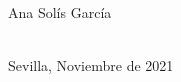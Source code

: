 \begin{titlepage}
\begin{minipage}{14cm}
\HRule \\[3.5cm]


{\Large

Ana Solís García} \\[0.5cm]

{\large
Sevilla, Noviembre de 2021
}

\end{minipage}

\vfill %

\cleardoublepage
\thispagestyle{empty}
\end{titlepage}

\raggedbottom

